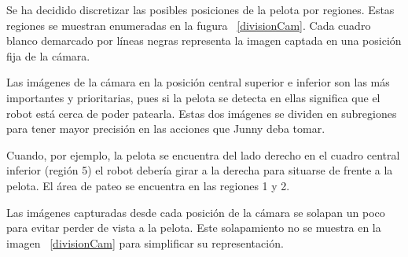 Se ha decidido discretizar las posibles posiciones de la pelota por regiones. Estas regiones se muestran enumeradas en la fugura ~\ref{divisionCam}. Cada cuadro blanco demarcado por líneas negras representa la imagen captada en una posición fija de la cámara. 

Las im\'agenes de la cámara en la posición central superior e inferior son las más importantes y prioritarias, pues si la pelota se detecta en ellas significa que el robot está cerca de poder patearla. Estas dos im\'agenes se dividen en subregiones para tener mayor precisión en las acciones que Junny deba tomar.

Cuando, por ejemplo, la pelota se encuentra del lado derecho en el cuadro central inferior (región 5) el robot debería girar a la derecha para situarse de frente a la pelota. El área de pateo se encuentra en las regiones 1 y 2.

Las imágenes capturadas desde cada posición de la cámara se solapan un poco para evitar perder de vista a la pelota. Este solapamiento no se muestra en la imagen ~\ref{divisionCam} para simplificar su representación.





 

